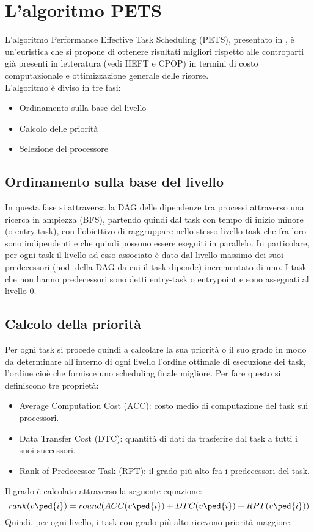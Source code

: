\chapter{L'algoritmo PETS}\label{capitolo3pets}
\vspace{4cm}
L'algoritmo Performance Effective Task Scheduling (PETS), presentato in \cite{ilavarasan2007low}, è un'euristica che si propone di ottenere risultati migliori rispetto alle controparti già presenti in letteratura (vedi HEFT\cite{993206} e CPOP\cite{993206}) in termini di costo computazionale e ottimizzazione generale delle risorse.
\\
L'algoritmo è diviso in tre fasi:
\begin{itemize}
	\item Ordinamento sulla base del livello
	\item Calcolo delle priorità
	\item Selezione del processore 
\end{itemize}

\section{Ordinamento sulla base del livello}
In questa fase si attraversa la DAG delle dipendenze tra processi attraverso una ricerca in ampiezza (BFS), partendo quindi dal task con tempo di inizio minore (o entry-task), con l'obiettivo di raggruppare nello stesso livello task che fra loro sono indipendenti e che quindi possono essere eseguiti in parallelo.
In particolare, per ogni task il livello ad esso associato è dato dal livello massimo dei suoi predecessori (nodi della DAG da cui il task dipende) incrementato di uno. I task che non hanno predecessori sono detti entry-task o entrypoint e sono assegnati al livello 0.


\section{Calcolo della priorità}
Per ogni task si procede quindi a calcolare la sua priorità o il suo grado in modo da determinare all'interno di ogni livello l'ordine ottimale di esecuzione dei task, l'ordine cioè che fornisce uno scheduling finale migliore.
Per fare questo si definiscono tre proprietà:
\begin{itemize}
	\item Average Computation Cost (ACC): costo medio di computazione del task sui processori.
	\item Data Transfer Cost (DTC): quantità di dati da trasferire dal task a tutti i suoi successori.
	\item Rank of Predecessor Task (RPT): il grado più alto fra i predecessori del task.
\end{itemize}
Il grado è calcolato attraverso la seguente equazione:
\begin{equation}\label{Grado}
	rank(v\ped{i}) = round(ACC(v\ped{i}) + DTC(v\ped{i}) + RPT(v\ped{i}))
\end{equation}
Quindi, per ogni livello, i task con grado più alto ricevono priorità maggiore.



